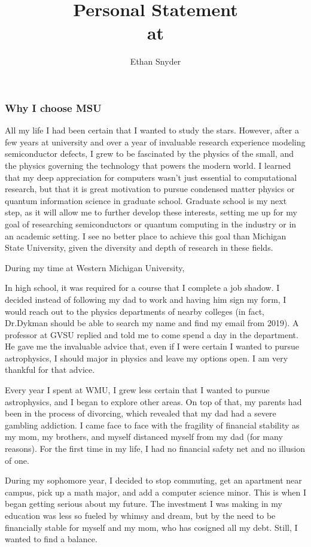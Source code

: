 \documentclass[11pt]{article}
\title{Personal Statement\\
	\large \dept{} at \school{}}
\author{Ethan Snyder}
\date{}
\newcommand{\school}{Michigan State University}
\newcommand{\schoolabbr}{MSU}
\begin{document}
\maketitle
\subsubsection*{Why I choose \schoolabbr}
All my life I had been certain that I wanted to study the stars. However, after a few years at university and over a year of invaluable research experience modeling semiconductor defects, I grew to be fascinated by the physics of the small, and the physics governing the technology that powers the modern world. I learned that my deep appreciation for computers wasn't just essential to computational research, but that it is great motivation to pursue condensed matter physics or quantum information science in graduate school. Graduate school is my next step, as it will allow me to further develop these interests, setting me up for my goal of researching semiconductors or quantum computing in the industry or in an academic setting. I see no better place to achieve this goal than \school{}, given the diversity and depth of research in these fields.

During my time at Western Michigan University, 

In high school, it was required for a course that I complete a job shadow. I decided instead of following my dad to work and having him sign my form, I would reach out to the physics departments of nearby colleges (in fact, Dr.\@ Dykman should be able to search my name and find my email from 2019). A professor at GVSU replied and told me to come spend a day in the department. He gave me the invaluable advice that, even if I were certain I wanted to pursue astrophysics, I should major in physics and leave my options open. I am very thankful for that advice.

Every year I spent at WMU, I grew less certain that I wanted to pursue astrophysics, and I began to explore other areas. On top of that, my parents had been in the process of divorcing, which revealed that my dad had a severe gambling addiction. I came face to face with the fragility of financial stability as my mom, my brothers, and myself distanced myself from my dad (for many reasons). For the first time in my life, I had no financial safety net and no illusion of one.

During my sophomore year, I decided to stop commuting, get an apartment near campus, pick up a math major, and add a computer science minor. This is when I began getting serious about my future. The investment I was making in my education was less so fueled by whimsy and dream, but by the need to be financially stable for myself and my mom, who has cosigned all my debt. Still, I wanted to find a balance.
\end{document}
